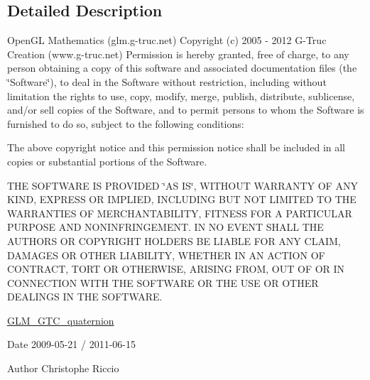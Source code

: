 \subsection{Detailed Description}
Open\-G\-L Mathematics (glm.\-g-\/truc.\-net) Copyright (c) 2005 -\/ 2012 G-\/\-Truc Creation (www.\-g-\/truc.\-net) Permission is hereby granted, free of charge, to any person obtaining a copy of this software and associated documentation files (the \char`\"{}\-Software\char`\"{}), to deal in the Software without restriction, including without limitation the rights to use, copy, modify, merge, publish, distribute, sublicense, and/or sell copies of the Software, and to permit persons to whom the Software is furnished to do so, subject to the following conditions\-:

The above copyright notice and this permission notice shall be included in all copies or substantial portions of the Software.

T\-H\-E S\-O\-F\-T\-W\-A\-R\-E I\-S P\-R\-O\-V\-I\-D\-E\-D \char`\"{}\-A\-S I\-S\char`\"{}, W\-I\-T\-H\-O\-U\-T W\-A\-R\-R\-A\-N\-T\-Y O\-F A\-N\-Y K\-I\-N\-D, E\-X\-P\-R\-E\-S\-S O\-R I\-M\-P\-L\-I\-E\-D, I\-N\-C\-L\-U\-D\-I\-N\-G B\-U\-T N\-O\-T L\-I\-M\-I\-T\-E\-D T\-O T\-H\-E W\-A\-R\-R\-A\-N\-T\-I\-E\-S O\-F M\-E\-R\-C\-H\-A\-N\-T\-A\-B\-I\-L\-I\-T\-Y, F\-I\-T\-N\-E\-S\-S F\-O\-R A P\-A\-R\-T\-I\-C\-U\-L\-A\-R P\-U\-R\-P\-O\-S\-E A\-N\-D N\-O\-N\-I\-N\-F\-R\-I\-N\-G\-E\-M\-E\-N\-T. I\-N N\-O E\-V\-E\-N\-T S\-H\-A\-L\-L T\-H\-E A\-U\-T\-H\-O\-R\-S O\-R C\-O\-P\-Y\-R\-I\-G\-H\-T H\-O\-L\-D\-E\-R\-S B\-E L\-I\-A\-B\-L\-E F\-O\-R A\-N\-Y C\-L\-A\-I\-M, D\-A\-M\-A\-G\-E\-S O\-R O\-T\-H\-E\-R L\-I\-A\-B\-I\-L\-I\-T\-Y, W\-H\-E\-T\-H\-E\-R I\-N A\-N A\-C\-T\-I\-O\-N O\-F C\-O\-N\-T\-R\-A\-C\-T, T\-O\-R\-T O\-R O\-T\-H\-E\-R\-W\-I\-S\-E, A\-R\-I\-S\-I\-N\-G F\-R\-O\-M, O\-U\-T O\-F O\-R I\-N C\-O\-N\-N\-E\-C\-T\-I\-O\-N W\-I\-T\-H T\-H\-E S\-O\-F\-T\-W\-A\-R\-E O\-R T\-H\-E U\-S\-E O\-R O\-T\-H\-E\-R D\-E\-A\-L\-I\-N\-G\-S I\-N T\-H\-E S\-O\-F\-T\-W\-A\-R\-E.

\hyperlink{group__gtc__quaternion}{G\-L\-M\-\_\-\-G\-T\-C\-\_\-quaternion}

\begin{DoxyDate}{Date}
2009-\/05-\/21 / 2011-\/06-\/15 
\end{DoxyDate}
\begin{DoxyAuthor}{Author}
Christophe Riccio 
\end{DoxyAuthor}
